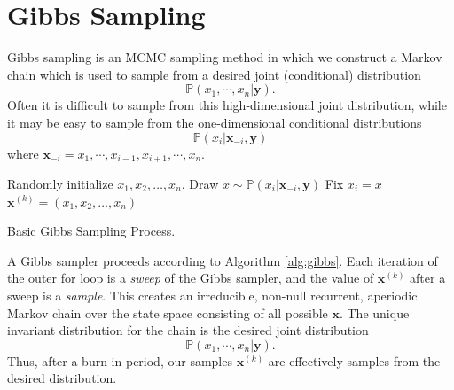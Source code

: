 
\section*{Gibbs Sampling}
Gibbs sampling is an MCMC sampling method in which we construct a Markov chain which is used to sample from a desired joint (conditional) distribution
\begin{equation*}
\mathbb{P}(x_{1},\cdots,x_{n} | \mathbf{y}).
\end{equation*}
Often it is difficult to sample from this high-dimensional joint distribution, while it may be easy to sample from the one-dimensional
conditional distributions
\begin{equation*}
\mathbb{P}(x_{i} | \mathbf{x}_{-i}, \mathbf{y})
\end{equation*}
where $\mathbf{x}_{-i} = x_{1},\cdots,x_{i-1},x_{i+1},\cdots,x_{n}.$

\begin{algorithm}
\begin{algorithmic}[1]
    \State \textrm{Randomly initialize } $x_1,x_2,\ldots,x_n$.
            \State \textrm{Draw } $x \sim \mathbb{P}(x_{i} | \mathbf{x}_{-i}, \mathbf{y})$
            \State \textrm{Fix } $x_i = x$
        \EndFor
        \State $\mathbf{x}^{(k)}= (x_1,x_2,\ldots,x_n)$
    \EndFor
\EndProcedure
\end{algorithmic}
\caption{Basic Gibbs Sampling Process.}
\label{alg:gibbs}
\end{algorithm}
A Gibbs sampler proceeds according to Algorithm \ref{alg:gibbs}.
Each iteration of the outer for loop is a \emph{sweep} of the Gibbs sampler, and the value of $\mathbf{x}^{(k)}$ after a sweep is a \emph{sample}. This creates an irreducible, non-null recurrent, aperiodic Markov chain over the state space consisting of all possible $\mathbf{x}$. The unique invariant distribution for the chain is the desired joint distribution
\begin{equation*}
\mathbb{P}(x_{1},\cdots,x_{n} | \mathbf{y}).
\end{equation*}
Thus, after a burn-in period, our samples $\mathbf{x}^{(k)}$ are effectively samples from the desired distribution.


